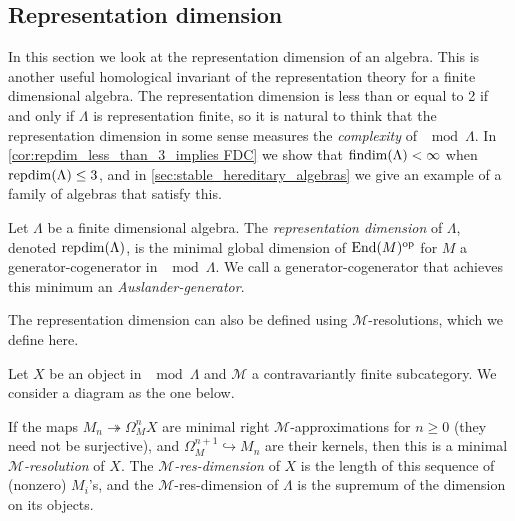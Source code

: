 \subsection{Representation dimension}\label{sec:repdimension}

In this section we look at the representation dimension of an algebra. This is another useful homological invariant of the representation theory for a finite dimensional algebra. The representation dimension is less than or equal to 2 if and only if $\Lambda$ is representation finite, so it is natural to think that the representation dimension in some sense measures the \textit{complexity} of $\mod\Lambda$. In \cref{cor:repdim_less_than_3_implies FDC} we show that $\operatorname{findim}(\Lambda) < \infty$ when $\operatorname{repdim}(\Lambda) \leq 3$, and in \cref{sec:stable_hereditary_algebras} we give an example of a family of algebras that satisfy this.

\begin{defn}
	Let $\Lambda$ be a finite dimensional algebra. The \emph{representation dimension} of $\Lambda$, denoted $\operatorname{repdim}(\Lambda)$, is the minimal global dimension of $\operatorname{End}(M)^{\operatorname{op}}$ for $M$ a generator-cogenerator in $\mod\Lambda$. We call a generator-cogenerator that achieves this minimum an \emph{Auslander-generator}.
\end{defn}

The representation dimension can also be defined using $\mathcal M$-resolutions, which we define here.

\begin{defn}
	Let $X$ be an object in $\mod\Lambda$ and $\mathcal M$ a contravariantly finite subcategory. We consider a diagram as the one below.
	\begin{center}
	\end{center}
	If the maps $M_n \twoheadrightarrow \Omega_M^nX$ are minimal right $\mathcal M$-approximations for $n\geq 0$ (they need not be surjective), and $\Omega_M^{n+1} \hookrightarrow M_n$ are their kernels, then this is a minimal \emph{$\mathcal M$-resolution} of $X$. The \emph{$\mathcal M$-res-dimension} of $X$ is the length of this sequence of (nonzero) $M_i$'s, and the $\mathcal M$-res-dimension of $\Lambda$ is the supremum of the dimension on its objects.
\end{defn}

